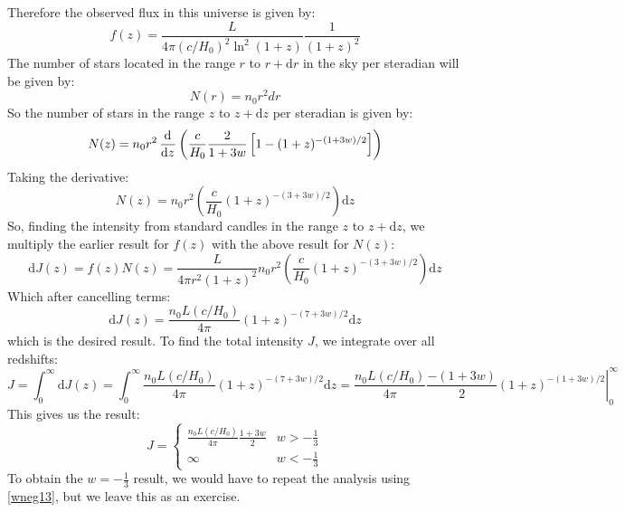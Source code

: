 Therefore the observed flux in this universe is given by:
\begin{equation}\label{wneg13}
    \boxed{f(z) = \frac{L}{4\pi(c/H_0)^2\ln^2(1+z)}\frac{1}{(1+z)^2}}
\end{equation}
The number of stars located in the range $r$ to $r + \mathrm d r$ in the sky per steradian will be given by:
\begin{equation}
    N(r) = n_0 r^2 dr
\end{equation}
So the number of stars in the range $z$ to $z + \mathrm d z$ per steradian is given by:
\begin{equation}
    N(z) = n_0 r^2 \dod{}{z}\left(\frac{c}{H_0}\frac{2}{1+3w}\left[1 - (1+z)^{-(1+3w)/2}\right]\right)
\end{equation}
Taking the derivative:
\begin{equation}
    N(z) =  n_0 r^2 \left(\frac{c}{H_0}(1+z)^{-(3 + 3w)/2}\right)\mathrm d z
\end{equation}
So, finding the intensity from standard candles in the range $z$ to $z + \mathrm d z$, we multiply the earlier result for $f(z)$ with the above result for $N(z)$:
\begin{equation}
    \mathrm d J(z) = f(z)N(z) = \frac{L}{4\pi r^2(1+z)^2} n_0 r^2\left(\frac{c}{H_0}(1+z)^{-(3 + 3w)/2}\right)\mathrm d z
\end{equation}
Which after cancelling terms:
\begin{equation}
    \boxed{\mathrm d J(z) = \frac{n_0L(c/H_0)}{4\pi}(1+z)^{-(7+3w)/2}\mathrm d z}
\end{equation}
which is the desired result. To find the total intensity $J$, we integrate over all redshifts:
\begin{equation}
    J = \int_0^\infty \mathrm d J(z) = \int_0^\infty  \frac{n_0L(c/H_0)}{4\pi}(1+z)^{-(7+3w)/2}\mathrm d z =   \left.\frac{n_0L(c/H_0)}{4\pi}\frac{-(1 + 3w)}{2}(1+z)^{-(1+3w)/2}\right|_0^\infty
\end{equation}
This gives us the result:
\begin{equation}
    J = \begin{cases}
        \frac{n_0 L(c/H_0)}{4\pi}\frac{1 + 3w}{2} & w > -\frac{1}{3}
        \\ \infty & w < -\frac{1}{3}
    \end{cases}
\end{equation}
To obtain the $w = -\frac{1}{3}$ result, we would have to repeat the analysis using \eqref{wneg13}, but we leave this as an exercise.

